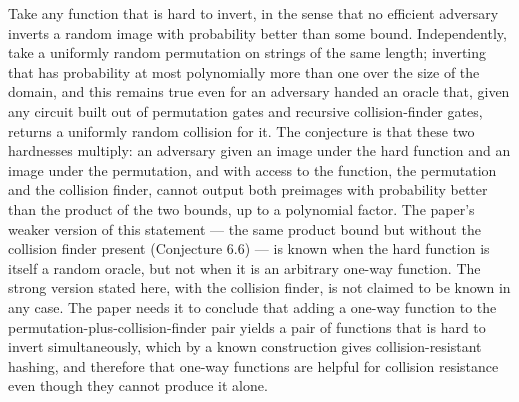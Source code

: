 \documentclass{aicr-conjecture}
\begin{document}

\vspace{0.4em}

\begin{informalconjecture}
Take any function that is hard to invert, in the sense that no efficient
adversary inverts a random image with probability better than some bound.
Independently, take a uniformly random permutation on strings of the same
length; inverting that has probability at most polynomially more than one
over the size of the domain, and this remains true even for an adversary
handed an oracle that, given any circuit built out of permutation gates
and recursive collision-finder gates, returns a uniformly random collision
for it. The conjecture is that these two hardnesses multiply: an adversary
given an image under the hard function and an image under the permutation,
and with access to the function, the permutation and the collision finder,
cannot output both preimages with probability better than the product of
the two bounds, up to a polynomial factor. The paper's weaker version of
this statement --- the same product bound but without the collision finder
present (Conjecture 6.6) --- is known when the hard function is itself a
random oracle, but not when it is an arbitrary one-way function. The
strong version stated here, with the collision finder, is not claimed to
be known in any case. The paper needs it to conclude that adding a one-way
function to the permutation-plus-collision-finder pair yields a pair of
functions that is hard to invert simultaneously, which by a known
construction gives collision-resistant hashing, and therefore that one-way
functions are helpful for collision resistance even though they cannot
produce it alone.
\end{informalconjecture}
\end{document}
